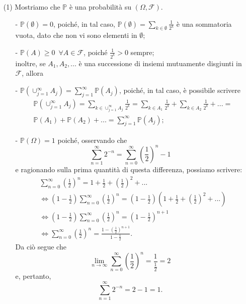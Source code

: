 \documentclass[11pt,largemargins]{homework}
\begin{document}
  \newpage
  \begin{enumerate}
  \item[(1)]
  Mostriamo che $\mathbb{P}$ è una probabilità su $\left(\Omega,\mathcal{F}\right)$.
  \begin{itemize}
  \item[-]
  $\mathbb{P}\left(\emptyset\right)=0$, poiché, in tal caso, $\mathbb{P}\left(\emptyset\right)=\sum_{k\in \emptyset}\frac{1}{2^{k}}$ è una sommatoria vuota, dato che non vi sono elementi in $\emptyset$;
  \item[-]
  $\mathbb{P}\left(A\right)\geq 0 \,\,\,\forall A\in \mathcal{F}$, poiché $\frac{1}{2^{k}}> 0$ sempre;\\
  inoltre, se $A_{1},A_{2},...$ è una successione di insiemi mutuamente disgiunti in $\mathcal{F}$, allora 
  \item[-]
  $\mathbb{P}\left(\cup_{j=1}^{\infty}A_{j}\right)=\sum_{j=1}^{\infty}\mathbb{P}\left(A_{j}\right)$, poiché, in tal caso, è possibile scrivere
  \begin{align*}
  &\mathbb{P}\left(\cup_{j=1}^{\infty}A_{j}\right)=\sum_{k\in\cup_{j=1}^{\infty}A_{j}}\frac{1}{2^{k}}=\sum_{k\in A_{1}}\frac{1}{2^{k}}+\sum_{k\in A_{2}}\frac{1}{2^{k}}+...=\\
  &\mathbb{P}\left(A_{1}\right)+\mathbb{P}\left(A_{2}\right)+...=\sum_{j=1}^{\infty}\mathbb{P}\left(A_{j}\right);
\end{align*}   
\item[-]
$\mathbb{P}\left(\Omega\right)=1$ poiché, osservando che
\begin{equation*}
\sum_{n=1}^{\infty}2^{-n}=\sum_{n=0}^{\infty}\left(\frac{1}{2}\right)^{n}-1
\end{equation*}
e ragionando sulla prima quantità di questa differenza, possiamo scrivere:
\begin{align*}
&\sum_{n=0}^{\infty}\left(\frac{1}{2}\right)^{n}=1+\frac{1}{2}+\left(\frac{1}{2}\right)^{2}+...\\
&\Leftrightarrow \left(1-\frac{1}{2}\right)\sum_{n=0}^{\infty}\left(\frac{1}{2}\right)^{n}=\left(1-\frac{1}{2}\right)\left(1+\frac{1}{2}+\left(\frac{1}{2}\right)^{2}+...\right)\\
&\Leftrightarrow \left(1-\frac{1}{2}\right)\sum_{n=0}^{\infty}\left(\frac{1}{2}\right)^{n}=\left(1-\frac{1}{2}\right)^{n+1}\\
&\Leftrightarrow \sum_{n=0}^{\infty}\left(\frac{1}{2}\right)^{n}=\frac{1-\left(\frac{1}{2}\right)^{n+1}}{1-\frac{1}{2}}.
\end{align*}
Da ciò segue che
\begin{equation*}
\lim\limits_{n\rightarrow\infty}\sum_{n=0}^{\infty}\left(\frac{1}{2}\right)^{n}=\frac{1}{\frac{1}{2}}=2
\end{equation*}
e, pertanto,
\begin{equation*}
\sum_{n=1}^{\infty}2^{-n}=2-1=1.
\end{equation*}
\end{itemize}



\end{enumerate}
\end{document}
